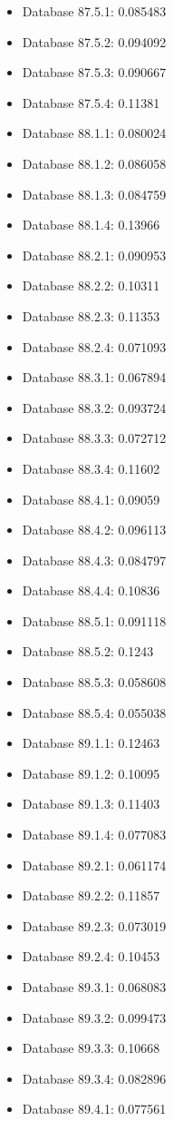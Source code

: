 \begin{itemize}
\item Database 87.5.1: 0.085483
\item Database 87.5.2: 0.094092
\item Database 87.5.3: 0.090667
\item Database 87.5.4: 0.11381
\item Database 88.1.1: 0.080024
\item Database 88.1.2: 0.086058
\item Database 88.1.3: 0.084759
\item Database 88.1.4: 0.13966
\item Database 88.2.1: 0.090953
\item Database 88.2.2: 0.10311
\item Database 88.2.3: 0.11353
\item Database 88.2.4: 0.071093
\item Database 88.3.1: 0.067894
\item Database 88.3.2: 0.093724
\item Database 88.3.3: 0.072712
\item Database 88.3.4: 0.11602
\item Database 88.4.1: 0.09059
\item Database 88.4.2: 0.096113
\item Database 88.4.3: 0.084797
\item Database 88.4.4: 0.10836
\item Database 88.5.1: 0.091118
\item Database 88.5.2: 0.1243
\item Database 88.5.3: 0.058608
\item Database 88.5.4: 0.055038
\item Database 89.1.1: 0.12463
\item Database 89.1.2: 0.10095
\item Database 89.1.3: 0.11403
\item Database 89.1.4: 0.077083
\item Database 89.2.1: 0.061174
\item Database 89.2.2: 0.11857
\item Database 89.2.3: 0.073019
\item Database 89.2.4: 0.10453
\item Database 89.3.1: 0.068083
\item Database 89.3.2: 0.099473
\item Database 89.3.3: 0.10668
\item Database 89.3.4: 0.082896
\item Database 89.4.1: 0.077561

\end{itemize}
